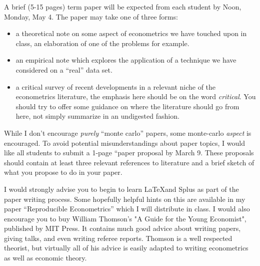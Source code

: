 \vspace{10mm}

A brief (5-15 pages) term paper will be expected from each student by 
Noon, Monday, May 4.  The paper may take one of three forms:

\begin{itemize}
\item a theoretical note on some aspect of econometrics we have touched upon 
in class, an elaboration of one of the problems for example.

\item an empirical note which explores the application of a technique we have 
considered on a ``real'' data set.

\item a critical survey of recent developments in a relevant niche of the 
econometrics literature, the emphasis here should be on the word 
{\em critical}.  You should try to offer some guidance on where the literature 
should go from here, not simply summarize in an undigested fashion.
\end{itemize}

While I don't encourage {\em purely} ``monte carlo'' papers, some monte-carlo 
{\em aspect} is encouraged.  To avoid potential misunderstandings about paper
topics, I would like all students to submit a 1-page ``paper proposal by 
March 9.  These proposals should contain at least three relevant references to 
literature and a brief sketch of what you propose to do in your paper.

I would strongly advise you to begin to learn \LaTeX and Splus as part of
the paper writing process. Some hopefully helpful hints on this are
available in my paper ``Reproducible Econometrics'' which I will distribute
in class.  I would also encourage you to buy William Thomson's "A
Guide for the Young Economist", published by MIT Press.  It contains much
good advice about writing papers, giving talks, and even writing referee
reports.  Thomson is a well respected theorist, but virtually all of his
advice is easily adapted to writing econometrics as well as economic theory.



